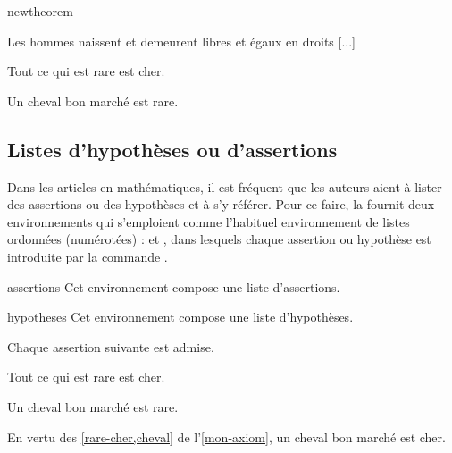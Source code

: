 \documentclass[french,nolocaltoc]{nwejmart}
\newtheorem{article}
\newtheorem[title=Fait,style=definition]{fact}
\begin{document}
\begin{docCommand}{newtheorem}{}
\begin{bodycode}
\begin{article}
Les hommes naissent et demeurent libres et égaux en droits [...]
\end{article}
\begin{fact*}
Tout ce qui est rare est cher.
\end{fact*}
\begin{fact}
Un cheval bon marché est rare.
\end{fact}
\end{bodycode}
\end{docCommand}

\subsection{Listes d'hypothèses ou d'assertions}
\label{sec:list-dhyp-ou}

Dans les articles en mathématiques, il est fréquent que les auteurs aient
à lister des assertions ou des hypothèses et à s'y référer. Pour ce faire, la
\nwejmauthorcl{} fournit deux environnements qui s'emploient comme l'habituel
environnement  de listes ordonnées (numérotées) :
 et , dans lesquels chaque assertion ou
hypothèse est introduite par la commande .

\begin{docEnvironment}[doclang/environment content=assertions]{assertions}{}
  Cet environnement compose une liste d'assertions.
\end{docEnvironment}
\begin{docEnvironment}[doclang/environment content=hypothèses]{hypotheses}{}
  Cet environnement compose une liste d'hypothèses.
\end{docEnvironment}

\begin{bodycode}[listing and text,listing options={deletekeywords={[1]{label}}}]
\begin{axiom}\label{mon-axiom}
  Chaque assertion suivante est admise.
  \begin{assertions}
  \item\label{rare-cher} Tout ce qui est rare est cher.
  \item\label{cheval} Un cheval bon marché est rare.
  \end{assertions}
\end{axiom}
En vertu des \vref{rare-cher,cheval} de l'\vref{mon-axiom},
un cheval bon marché est cher.
\end{bodycode}
\end{document}
